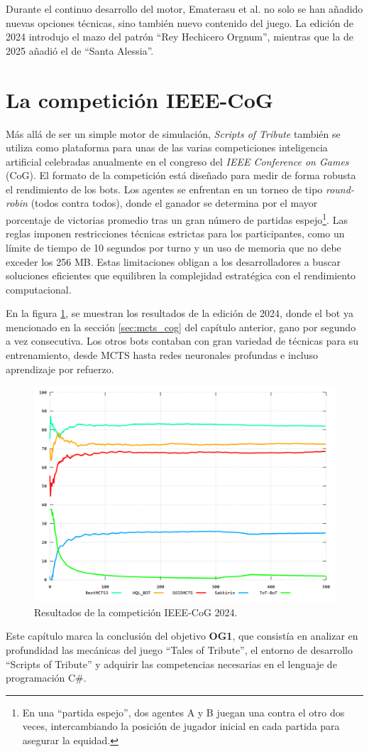 Durante el continuo desarrollo del motor, Ematerasu et al. no solo se han añadido nuevas opciones técnicas, sino también nuevo contenido del juego. La edición de 2024 introdujo el mazo del patrón ``Rey Hechicero Orgnum'', mientras que la de 2025 añadió el de ``Santa Alessia''.

\section{La competición IEEE-CoG} \label{sec:competicion_ieee_cog}

Más allá de ser un simple motor de simulación, \textit{Scripts of Tribute} también se utiliza como plataforma para unas de las varias competiciones inteligencia artificial celebradas anualmente en el congreso del \textit{IEEE Conference on Games} (CoG). El formato de la competición está diseñado para medir de forma robusta el rendimiento de los bots. Los agentes se enfrentan en un torneo de tipo \textit{round-robin} (todos contra todos), donde el ganador se determina por el mayor porcentaje de victorias promedio tras un gran número de partidas espejo\footnote{En una ``partida espejo'', dos agentes A y B juegan una contra el otro dos veces, intercambiando la posición de jugador inicial en cada partida para asegurar la equidad.}. Las reglas imponen restricciones técnicas estrictas para los participantes, como un límite de tiempo de 10 segundos por turno y un uso de memoria que no debe exceder los 256 MB. Estas limitaciones obligan a los desarrolladores a buscar soluciones eficientes que equilibren la complejidad estratégica con el rendimiento computacional.

En la figura \ref{fig:competicion_ieee_cog_2024}, se muestran los resultados de la edición de 2024, donde el bot ya mencionado en la sección \ref{sec:mcts_cog} del capítulo anterior, gano por segundo a vez consecutiva. Los otros bots contaban con gran variedad de técnicas para su entrenamiento, desde MCTS hasta redes neuronales profundas e incluso aprendizaje por refuerzo.

\begin{figure}[H]
	\centering
	\includegraphics[width=1.0\textwidth]{img/ieee-cog-2024.png}
	\caption{Resultados de la competición IEEE-CoG 2024. \cite{ematerasu_scriptsoftribute-competitionsarchive_2024}}
	\label{fig:competicion_ieee_cog_2024}
\end{figure}

Este capítulo marca la conclusión del objetivo \textbf{OG1}, que consistía en analizar en profundidad las mecánicas del juego ``Tales of Tribute'', el entorno de desarrollo ``Scripts of Tribute'' y adquirir las competencias necesarias en el lenguaje de programación C\#.